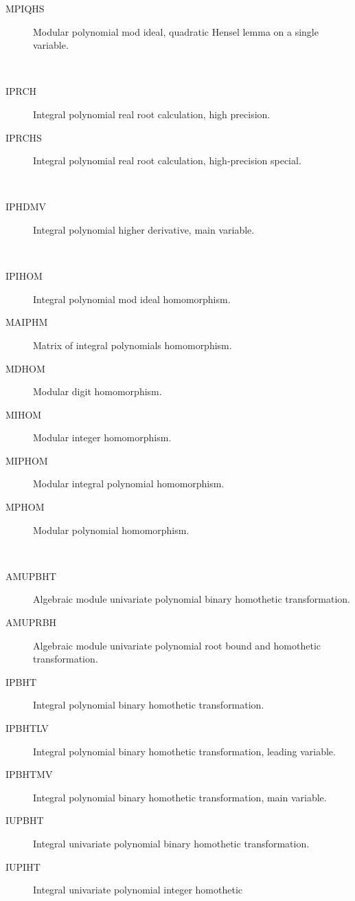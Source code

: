 \begin{description}
\begin{description}
  \item[MPIQHS]  Modular polynomial mod ideal, quadratic Hensel lemma on a
    single variable.
  \end{description}
\item[high] \ \ 
  \begin{description}
  \item[IPRCH]  Integral polynomial real root calculation, high precision.
  \item[IPRCHS]  Integral polynomial real root calculation, high-precision
    special.
  \end{description}
\item[higher] \ \ 
  \begin{description}
  \item[IPHDMV]  Integral polynomial higher derivative, main variable.
  \end{description}
\item[homomorphism] \ \ 
  \begin{description}
  \item[IPIHOM]  Integral polynomial mod ideal homomorphism.
  \item[MAIPHM]  Matrix of integral polynomials homomorphism.
  \item[MDHOM]  Modular digit homomorphism.
  \item[MIHOM]  Modular integer homomorphism.
  \item[MIPHOM]  Modular integral polynomial homomorphism.
  \item[MPHOM]  Modular polynomial homomorphism.
  \end{description}
\item[homothetic] \ \ 
  \begin{description}
  \item[AMUPBHT]  Algebraic module univariate polynomial binary homothetic
    transformation.
  \item[AMUPRBH]  Algebraic module univariate polynomial root bound and
    homothetic transformation.
  \item[IPBHT]  Integral polynomial binary homothetic transformation.
  \item[IPBHTLV]  Integral polynomial binary homothetic transformation,
    leading variable.
  \item[IPBHTMV]  Integral polynomial binary homothetic transformation, main
    variable.
  \item[IUPBHT]  Integral univariate polynomial binary homothetic
    transformation.
  \item[IUPIHT]  Integral univariate polynomial integer homothetic

\end{description}
\end{description}
